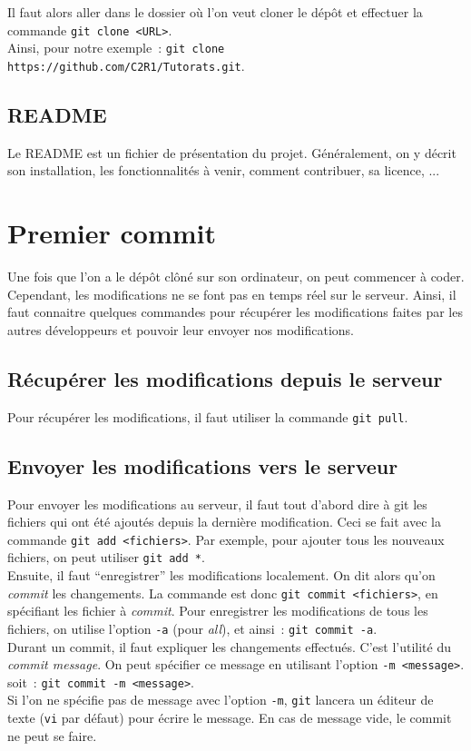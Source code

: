 \documentclass[a4paper,10pt]{report}
\begin{document}
Il faut alors aller dans le dossier o\`u l'on veut cloner le d\'ep\^ot et effectuer la commande \verb|git clone <URL>|.\\
Ainsi, pour notre exemple~: \verb|git clone https://github.com/C2R1/Tutorats.git|.

    \subsection{README}
Le README est un fichier de pr\'esentation du projet. G\'en\'eralement, on y d\'ecrit son installation, les fonctionnalit\'es \`a venir, comment contribuer, sa licence, ...
  \section{Premier commit}
Une fois que l'on a le d\'ep\^ot cl\^on\'e sur son ordinateur, on peut commencer \`a coder. Cependant, les modifications ne se font pas en temps r\'eel sur le serveur. Ainsi, il faut connaitre quelques commandes pour r\'ecup\'erer les modifications faites par les autres d\'eveloppeurs et pouvoir leur envoyer nos modifications.
     \subsection{R\'ecup\'erer les modifications depuis le serveur}
Pour r\'ecup\'erer les modifications, il faut utiliser la commande \verb|git pull|.
     \subsection{Envoyer les modifications vers le serveur}
Pour envoyer les modifications au serveur, il faut tout d'abord dire \`a git les fichiers qui ont \'et\'e ajout\'es depuis la derni\`ere modification. Ceci se fait avec la commande \verb|git add <fichiers>|. Par exemple, pour ajouter tous les nouveaux fichiers, on peut utiliser \verb|git add *|.\\

Ensuite, il faut ``enregistrer'' les modifications localement. On dit alors qu'on \emph{commit} les changements. La commande est donc \verb|git commit <fichiers>|, en sp\'ecifiant les fichier \`a \emph{commit}. Pour enregistrer les modifications de tous les fichiers, on utilise l'option \verb|-a| (pour \emph{all}), et ainsi~: \verb|git commit -a|.\\
Durant un commit, il faut expliquer les changements effectu\'es. C'est l'utilit\'e du \emph{commit message}. On peut sp\'ecifier ce message en utilisant l'option \verb|-m <message>|. soit~: \verb|git commit -m <message>|.\\
Si l'on ne sp\'ecifie pas de message avec l'option \verb|-m|, \verb|git| lancera un \'editeur de texte (\verb|vi| par d\'efaut) pour \'ecrire le message. En cas de message vide, le commit ne peut se faire.\\
\end{document}

